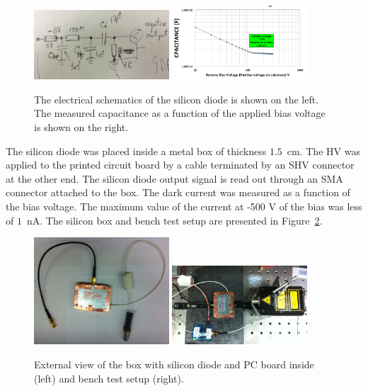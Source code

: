\documentclass[12pt]{article}
\begin{document}
{\begin{figure}[htbp] 
\centering
\includegraphics[width=0.45\textwidth]{plots/SiliconDiodeDiagram.png} 
\includegraphics[width=0.45\textwidth]{plots/SiliconDiodeCV.png} 
\caption{The electrical schematics of the silicon diode is shown on the left. The measured
capacitance as a function of the applied bias voltage is shown on the right. } 
\label{fig:SiliconDiode} 
\end{figure} 


The silicon diode was placed inside a metal box of thickness $1.5$~cm. 
The HV was applied to the printed circuit board by a cable terminated by an SHV connector
at the other end. The silicon diode output signal is read out through an SMA connector attached 
to the box. The dark current was measured as a function of the bias voltage. The maximum value of the 
current at -500 V of the bias was less of $1$~nA. The silicon box and bench test setup are presented 
in Figure~\ref{fig:SiliconPad}. 

\begin{figure}[htbp] 
\centering
\includegraphics[width=0.45\textwidth]{plots/SiliconPadExternalView.png} 
\includegraphics[width=0.45\textwidth]{plots/SiliconPadBench.png} 
\caption{External view of the box with silicon diode and PC board inside (left) and bench test setup (right).} 
\label{fig:SiliconPad} 
\end{figure} 


}
\end{document}
